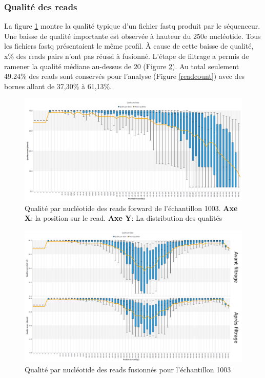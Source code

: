 \documentclass[12pt,a4paper]{article}
\begin{document}
\subsubsection{Qualité des reads}
La figure \ref{fastqt} montre la qualité typique d'un fichier fastq produit par le séquenceur. Une baisse de qualité importante est observée à hauteur du 250e nucléotide. Tous les fichiers fastq présentaient le même profil.
À cause de cette baisse de qualité, x\% des reads pairs n'ont pas réussi à fusionné.
L'étape de filtrage a permis de ramener la qualité médiane au-dessus de 20 (Figure \ref{fastqt_after}).
Au total seulement 49.24\% des reads sont conservés pour l'analyse (Figure \ref{readcount}) avec des bornes allant de 37,30\% à 61,13\%.



\begin{figure}[ht]
\begin{center}
\includegraphics[scale=0.45]{img/1003_forward.png}\hfill
\end{center}
\caption{Qualité par nucléotide des reads forward de l'échantillon 1003. \textbf{Axe X}: la position sur le read. \textbf{Axe Y}: La distribution des qualités}
\label{fastqt}
\end{figure}


\begin{figure}[h]
\begin{center}
\includegraphics[scale=0.45]{img/duo_merging.png}\hfill
\end{center}
\caption{Qualité par nucléotide des reads fusionnés pour l'échantillon 1003}
\label{fastqt_after}
\end{figure}
\end{document}

